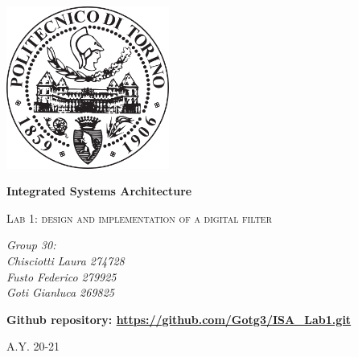 \documentclass[a4paper, titlepage]{article}
\begin{document}
\begin{titlepage}
	\centering
	\includegraphics[width=0.40\textwidth]{Politecnico_di_Torino_-_Logo}\par\vspace{1cm}
	\vspace{1cm}
	{\huge\bfseries Integrated Systems Architecture\par}
	\vspace{1cm}
	{\scshape\Large Lab 1: design and implementation of a digital filter \par}
	\vspace{2,5cm}
	{\Large\itshape Group 30:\\Chisciotti Laura 274728\\Fusto Federico 279925 \\Goti Gianluca 269825\par}
	\vspace{2,5cm}
		{\Large\bfseries Github repository: \url{https://github.com/Gotg3/ISA_Lab1.git}\par}
	\vfill

	\vfill
	{\Large A.Y. 20-21}
\end{titlepage}
\newpage
\tableofcontents
\newpage
\end{document}
